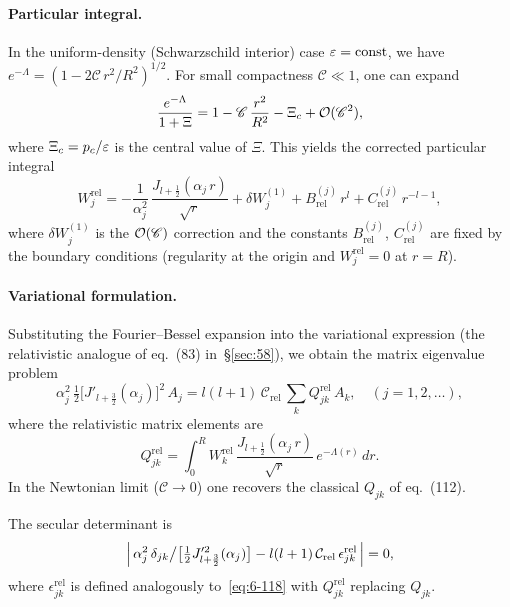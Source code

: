 \paragraph{Particular integral.}
In the uniform-density (Schwarzschild interior) case
$\varepsilon=\text{const}$, we have
$e^{-\Lambda}=(1-2\mathscr{C}\,r^{2}/R^{2})^{1/2}$.  For
small compactness $\mathscr{C}\ll 1$, one can expand
\begin{equation}
\label{eq:rel-59-expand}
\frac{e^{-\Lambda}}{1+\Xi}
  = 1 - \mathscr{C}\,\frac{r^{2}}{R^{2}}
  - \Xi_{c}
  + \mathcal{O}(\mathscr{C}^{2}),
\end{equation}
where $\Xi_{c} = p_{c}/\varepsilon$ is the central value of
$\Xi$.  This yields the corrected particular integral
\begin{equation}
\label{eq:rel-59-partint}
W_{j}^{\mathrm{rel}} =
  -\frac{1}{\alpha_{j}^{2}}\,
   \frac{J_{l+\frac{1}{2}}(\alpha_{j}\,r)}{\sqrt{r}}
  + \delta W_{j}^{(1)}
  + B^{(j)}_{\mathrm{rel}}\,r^{l}
  + C^{(j)}_{\mathrm{rel}}\,r^{-l-1},
\end{equation}
where $\delta W_{j}^{(1)}$ is the $\mathcal{O}(\mathscr{C})$ correction
and the constants $B^{(j)}_{\mathrm{rel}}$,
$C^{(j)}_{\mathrm{rel}}$ are fixed by the boundary conditions
(regularity at the origin and $W_{j}^{\mathrm{rel}}=0$ at $r=R$).

\paragraph{Variational formulation.}
Substituting the Fourier--Bessel expansion into the variational
expression (the relativistic analogue of eq.~(83) in~\S\ref{sec:58}),
we obtain the matrix eigenvalue problem
\begin{equation}
\label{eq:rel-59-matrix}
\alpha_{j}^{2}\,\tfrac{1}{2}\bigl[J'_{l+\frac{3}{2}}(\alpha_{j})\bigr]^{2}
  \,A_{j}
= l(l+1)\,\mathcal{C}_{\mathrm{rel}}\,
  \sum_{k} Q_{jk}^{\mathrm{rel}}\,A_{k},
\quad (j=1,2,\ldots),
\end{equation}
where the relativistic matrix elements are
\begin{equation}
\label{eq:rel-59-Qjk}
Q_{jk}^{\mathrm{rel}}
  = \int_{0}^{R}\!
    W_{k}^{\mathrm{rel}}\,
    \frac{J_{l+\frac{1}{2}}(\alpha_{j}\,r)}{\sqrt{r}}\,
    e^{-\Lambda(r)}\,
    dr.
\end{equation}
In the Newtonian limit ($\mathscr{C}\to 0$) one
recovers the classical $Q_{jk}$ of eq.~(112).

The secular determinant is
\begin{equation}
\label{eq:rel-59-secular}
\Bigl|\,\alpha_{j}^{2}\,\delta_{jk}\big/
  \bigl[\tfrac{1}{2}J'^{2}_{l+\frac{3}{2}}(\alpha_{j})\bigr]
  - l(l+1)\,\mathcal{C}_{\mathrm{rel}}\,
    \epsilon_{jk}^{\mathrm{rel}}\,\Bigr| = 0,
\end{equation}
where $\epsilon_{jk}^{\mathrm{rel}}$ is defined analogously
to~\eqref{eq:6-118} with $Q_{jk}^{\mathrm{rel}}$ replacing $Q_{jk}$.

